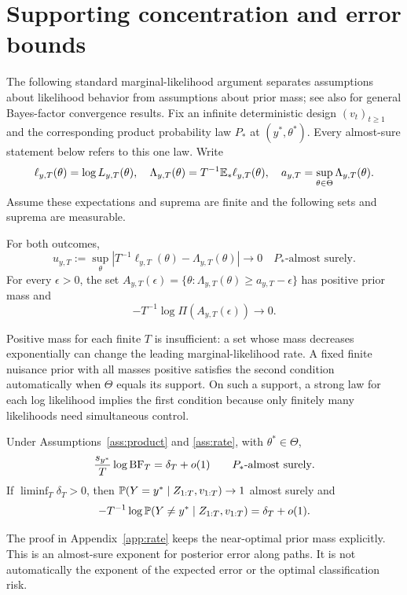 \section{Supporting concentration and error bounds}
\label{app:supporting-rate}
\label{sec:concentration}
The following standard marginal-likelihood argument separates assumptions about likelihood behavior from assumptions about prior mass; see also \cite{chatterjee2020bayes} for general Bayes-factor convergence results. Fix an infinite deterministic design $(v_t)_{t\geq1}$ and the corresponding product probability law $P_*$ at $(y^*,\theta^*)$. Every almost-sure statement below refers to this one law. Write
\[
 \ell_{y,T}(\theta)=\log L_{y,T}(\theta),\quad
 \Lambda_{y,T}(\theta)=T^{-1}\mathbb E_*\ell_{y,T}(\theta),\quad
 a_{y,T}=\sup_{\theta\in\Theta}\Lambda_{y,T}(\theta).
\]
Assume these expectations and suprema are finite and the following sets and suprema are measurable.

\begin{assumption}
\label{ass:rate}
For both outcomes,
\[
 u_{y,T}:=\sup_\theta|T^{-1}\ell_{y,T}(\theta)-\Lambda_{y,T}(\theta)|\longrightarrow0
 \quad P_*\text{-almost surely}.
\]
For every $\epsilon>0$, the set
$A_{y,T}(\epsilon)=\{\theta:\Lambda_{y,T}(\theta)\geq a_{y,T}-\epsilon\}$ has positive prior mass and
\[
 -T^{-1}\log\Pi(A_{y,T}(\epsilon))\longrightarrow0.
\]
\end{assumption}
Positive mass for each finite $T$ is insufficient: a set whose mass decreases exponentially can change the leading marginal-likelihood rate. A fixed finite nuisance prior with all masses positive satisfies the second condition automatically when $\Theta$ equals its support. On such a support, a strong law for each log likelihood implies the first condition because only finitely many likelihoods need simultaneous control.

\begin{lemma}
\label{thm:rate}
Under Assumptions~\ref{ass:product} and \ref{ass:rate}, with $\theta^*\in\Theta$,
\begin{equation}
 \frac{s_{y^*}}{T}\log\mathrm{BF}_T=\delta_T+o(1)\qquad P_*\text{-almost surely}.
 \label{eq:rate}
\end{equation}
If $\liminf_T\delta_T>0$, then $\mathbb P(Y=y^*\mid Z_{1:T},v_{1:T})\to1$ almost surely and
\[
 -T^{-1}\log\mathbb P(Y\ne y^*\mid Z_{1:T},v_{1:T})=\delta_T+o(1).
\]
\end{lemma}
The proof in Appendix~\ref{app:rate} keeps the near-optimal prior mass explicitly. This is an almost-sure exponent for posterior error along paths. It is not automatically the exponent of the expected error or the optimal classification risk.

